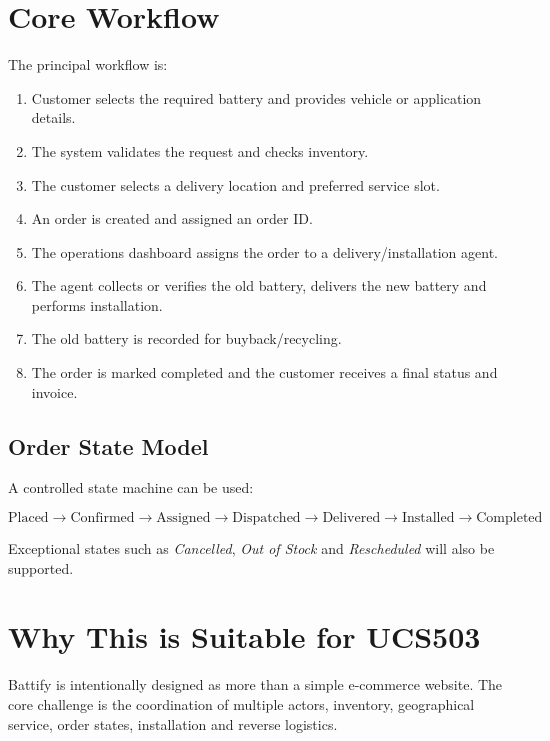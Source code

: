 \documentclass[11pt,a4paper]{article}
\begin{document}
\section{Core Workflow}

The principal workflow is:

\begin{enumerate}[leftmargin=0.7cm]
    \item Customer selects the required battery and provides vehicle or
    application details.
    \item The system validates the request and checks inventory.
    \item The customer selects a delivery location and preferred service slot.
    \item An order is created and assigned an order ID.
    \item The operations dashboard assigns the order to a delivery/installation
    agent.
    \item The agent collects or verifies the old battery, delivers the new
    battery and performs installation.
    \item The old battery is recorded for buyback/recycling.
    \item The order is marked completed and the customer receives a final
    status and invoice.
\end{enumerate}

\subsection{Order State Model}

A controlled state machine can be used:

\[
\text{Placed}
\rightarrow
\text{Confirmed}
\rightarrow
\text{Assigned}
\rightarrow
\text{Dispatched}
\rightarrow
\text{Delivered}
\rightarrow
\text{Installed}
\rightarrow
\text{Completed}
\]

Exceptional states such as \textit{Cancelled}, \textit{Out of Stock} and
\textit{Rescheduled} will also be supported.

\section{Why This is Suitable for UCS503}

Battify is intentionally designed as more than a simple e-commerce website.
The core challenge is the coordination of multiple actors, inventory,
geographical service, order states, installation and reverse logistics.
\end{document}
